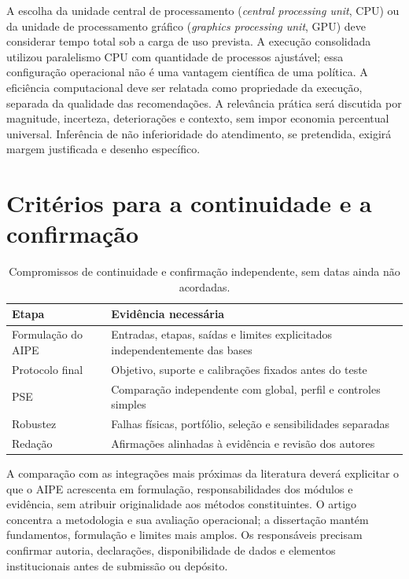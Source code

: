 A escolha da unidade central de processamento (\textit{central processing unit}, CPU) ou da unidade de processamento gráfico (\textit{graphics processing unit}, GPU) deve considerar tempo total sob a carga de uso prevista. A execução consolidada utilizou paralelismo CPU com quantidade de processos ajustável; essa configuração operacional não é uma vantagem científica de uma política. A eficiência computacional deve ser relatada como propriedade da execução, separada da qualidade das recomendações. A relevância prática será discutida por magnitude, incerteza, deteriorações e contexto, sem impor economia percentual universal. Inferência de não inferioridade do atendimento, se pretendida, exigirá margem justificada e desenho específico.

\section{Critérios para a continuidade e a confirmação}
\begin{table}[htbp]\centering\small
\caption{Compromissos de continuidade e confirmação independente, sem datas ainda não acordadas.}\label{tab:cronograma}
\begin{tabular}{@{}p{4cm}p{8.8cm}@{}}\toprule
Etapa & Evidência necessária\\\midrule
Formulação do AIPE & Entradas, etapas, saídas e limites explicitados independentemente das bases\\
Protocolo final & Objetivo, suporte e calibrações fixados antes do teste\\
PSE & Comparação independente com global, perfil e controles simples\\
Robustez & Falhas físicas, portfólio, seleção e sensibilidades separadas\\
Redação & Afirmações alinhadas à evidência e revisão dos autores\\\bottomrule
\end{tabular}\end{table}

A comparação com as integrações mais próximas da literatura deverá explicitar o que o AIPE acrescenta em formulação, responsabilidades dos módulos e evidência, sem atribuir originalidade aos métodos constituintes. O artigo concentra a metodologia e sua avaliação operacional; a dissertação mantém fundamentos, formulação e limites mais amplos. Os responsáveis precisam confirmar autoria, declarações, disponibilidade de dados e elementos institucionais antes de submissão ou depósito.
